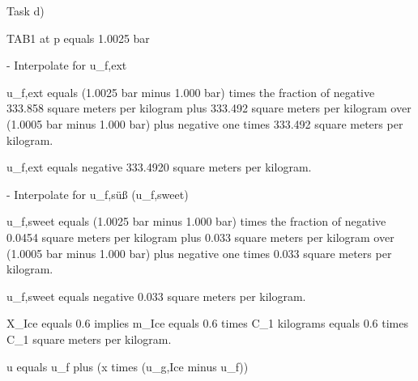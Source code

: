 Task d)

TAB1 at p equals 1.0025 bar

- Interpolate for u_{f,ext}

u_{f,ext} equals (1.0025 bar minus 1.000 bar) times the fraction of negative 333.858 square meters per kilogram plus 333.492 square meters per kilogram over (1.0005 bar minus 1.000 bar) plus negative one times 333.492 square meters per kilogram.

u_{f,ext} equals negative 333.4920 square meters per kilogram.

- Interpolate for u_{f,süß} (u_{f,sweet})

u_{f,sweet} equals (1.0025 bar minus 1.000 bar) times the fraction of negative 0.0454 square meters per kilogram plus 0.033 square meters per kilogram over (1.0005 bar minus 1.000 bar) plus negative one times 0.033 square meters per kilogram.

u_{f,sweet} equals negative 0.033 square meters per kilogram.

X_{Ice} equals 0.6 implies m_{Ice} equals 0.6 times C_{1} kilograms equals 0.6 times C_{1} square meters per kilogram.

u equals u_f plus (x times (u_{g,Ice} minus u_f))